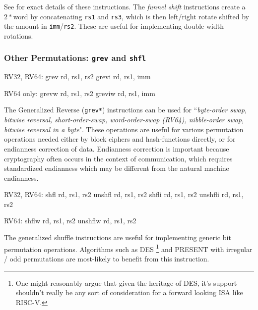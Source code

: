 See \cite[Section 2.9.3]{riscv:bitmanip:draft} for exact details of
these instructions.
The {\em funnel shift} instructions create a $2*$\XLEN word by
concatenating {\tt rs1} and {\tt rs3}, which is then
left/right rotate shifted by the amount in {\tt imm}/{\tt rs2}.
These are useful for implementing double-width rotations.



\subsubsection{Other Permutations: {\tt grev} and {\tt shfl}}

\begin{cryptobitmanipisa}
RV32, RV64:
    grev rd, rs1, rs2
    grevi rd, rs1, imm

RV64 only:
    grevw rd, rs1, rs2
    greviw rd, rs1, imm
\end{cryptobitmanipisa}

The Generalized Reverse ({\tt grev*}) instructions can be used for 
``{\em byte-order swap, bitwise reversal, short-order-swap,
word-order-swap (RV64), nibble-order swap, bitwise reversal in a byte}".
These operations are useful for various permutation operations
needed either by block ciphers and hash-functions directly, or for
endianness correction of data.
Endianness correction is important because
cryptography often occurs in the context of communication, which requires
standardized endianness which may be different from the natural machine
endianness.


\begin{cryptobitmanipisa}
RV32, RV64:
    shfl    rd, rs1, rs2
    unshfl  rd, rs1, rs2
    shfli   rd, rs1, rs2
    unshfli rd, rs1, rs2

RV64:
    shflw   rd, rs1, rs2
    unshflw rd, rs1, rs2
\end{cryptobitmanipisa}

The generalized shuffle instructions are useful for implementing
generic bit permutation operations.
Algorithms such as 
DES \footnote{
One might reasonably argue that given the heritage of DES, it's support
shouldn't really be any sort of consideration for a forward looking
ISA like RISC-V.
}
and
PRESENT\cite{block:present} with
irregular / odd permutations are most-likely to benefit from this
instruction.

